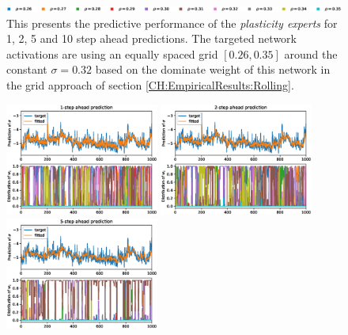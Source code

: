 \begin{figure}[H]
\begin{center}
        \includegraphics[width=1.0\textwidth]{Plots/Prediction/legend_Grid_Middle.eps}
    \end{center}
    \caption{This presents the predictive performance of the \textit{plasticity experts} for 1, 2, 5 and 10 step ahead predictions. The targeted network activations are using an equally spaced grid $\left[0.26, 0.35\right]$ around the constant $\sigma = 0.32$ based on the dominate weight of this network in the grid approach of section \ref{CH:EmpiricalResults:Rolling}.}
    \label{FIG:PlasticityGridMiddle}
\end{figure}

\begin{figure}[H]
    \begin{center}
        \includegraphics[width=0.45\textwidth]{Plots/Prediction/Plasticity_Constant_Low_rolling_1step.eps}
        \includegraphics[width=0.45\textwidth]{Plots/Prediction/Plasticity_Constant_Low_rolling_2step.eps} \\
        \includegraphics[width=0.45\textwidth]{Plots/Prediction/Plasticity_Constant_Low_rolling_5step.eps}

\end{center}
\end{figure}
